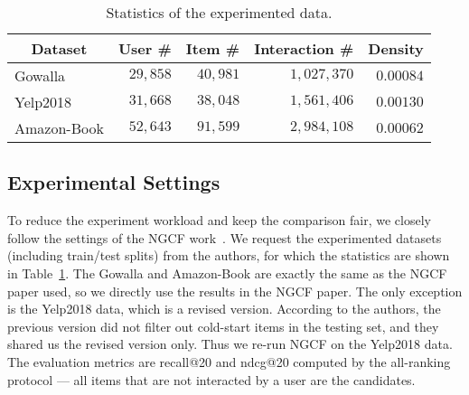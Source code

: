 \documentclass[sigconf]{acmart}
\theoremstyle{definition}
\begin{document}
\begin{table}[t]
\caption{Statistics of the experimented data.}
\vspace{-10px}
\label{tab:dataset}
\begin{tabular}{l|r|r|r|r}
\hline
\multicolumn{1}{c|}{\textbf{Dataset}} & \multicolumn{1}{c|}{\textbf{User \#}} & \multicolumn{1}{c|}{\textbf{Item \#}} & \multicolumn{1}{c|}{\textbf{Interaction \#}} & \multicolumn{1}{c}{\textbf{Density}} \\ \hline\hline
Gowalla & $29,858$ & $40,981$ & $1,027,370$ & $0.00084$ \\ \hline
Yelp2018 & $31,668$ & $38,048$ & $1,561,406$ & $0.00130$ \\ \hline
Amazon-Book & $52,643$ & $91,599$ & $2,984,108$ & $0.00062$ \\ \hline
\end{tabular}
\vspace{-15px}
\end{table}

\subsection{Experimental Settings}\label{ss:setting}
To reduce the experiment workload and keep the comparison fair, we closely follow the settings of the NGCF work~\cite{NGCF}. We request the experimented datasets (including train/test splits) from the authors, for which the statistics are shown in Table~\ref{tab:dataset}. 
The Gowalla and Amazon-Book are exactly the same as the NGCF paper used, so we directly use the results in the NGCF paper. The only exception is the Yelp2018 data, which is a revised version. According to the authors, the previous version did not filter out cold-start items in the testing set, and they shared us the revised version only. Thus we re-run NGCF on the Yelp2018 data.
The evaluation metrics are recall@20 and ndcg@20 computed by the all-ranking protocol --- all items that are not interacted by a user are the candidates. 
\end{document}
